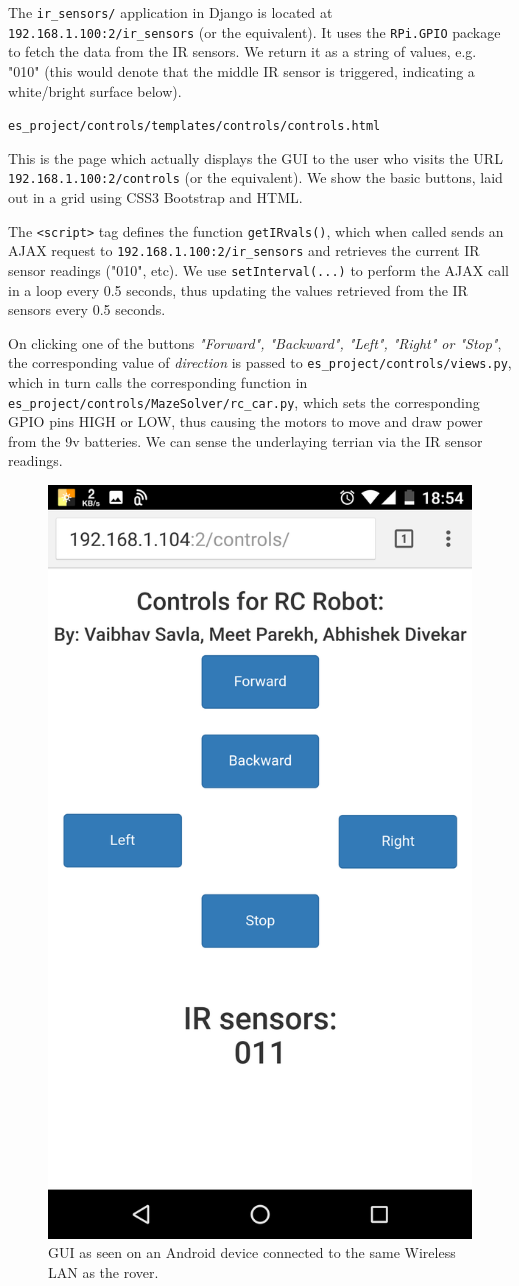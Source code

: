 \begin{description}[font=\quad $\circ$, topsep=6pt, itemsep=3em]
			The \texttt{ir\_sensors/} application in Django is located at \texttt{192.168.1.100:2/ir\_sensors} (or the equivalent). It uses the \texttt{RPi.GPIO} package to fetch the data from the IR sensors. We return it as a string of values, e.g. "010" (this would denote that the middle IR sensor is triggered, indicating a white/bright surface below).
		
		
		
	
		\item \texttt{es\_project/controls/templates/controls/controls.html}
			
		
		This is the page which actually displays the GUI to the user who visits the URL  \texttt{192.168.1.100:2/controls} (or the equivalent). We show the basic buttons, laid out in a grid using CSS3 Bootstrap and HTML. 
		
		The \texttt{<script>} tag defines the function \texttt{getIRvals()}, which when called sends an AJAX request to \texttt{192.168.1.100:2/ir\_sensors} and retrieves the current IR sensor readings ("010", etc). We use \texttt{setInterval(...)} to perform the AJAX call in a loop every 0.5 seconds, thus updating the values retrieved from the IR sensors every 0.5 seconds.
		
		On clicking one of the buttons \textit{"Forward", "Backward", "Left", "Right" or "Stop"}, the corresponding value of \textit{direction} is passed to \texttt{es\_project/controls/views.py}, which in turn calls the corresponding function in \texttt{es\_project/controls/MazeSolver/rc\_car.py}, which sets the corresponding GPIO pins HIGH or LOW, thus causing the motors to move and draw power from the 9v batteries. We can sense the underlaying terrian via the IR sensor readings.
		
		
		\begin{figure}
			\centering
			\includegraphics[width=0.3\linewidth]{"GUI_on_mobile.png"}
			\caption{GUI as seen on an Android device connected to the same Wireless LAN as the rover.}
			\label{fig:GUI_on_mobile}
		\end{figure}			
			

\end{description}
